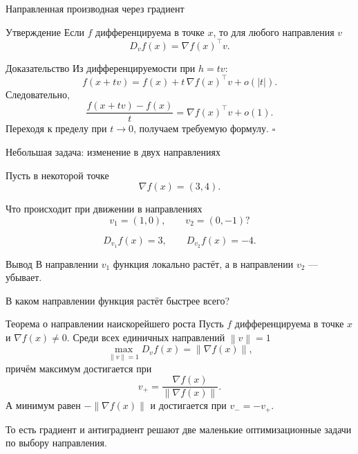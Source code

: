 \documentclass[aspectratio=169,10pt]{beamer}
\newcommand{\norm}[1]{\left\lVert #1\right\rVert}
\newcommand{\grad}{\nabla}
\begin{document}
\begin{frame}{Направленная производная через градиент}
\small
\vspace{0.10em}

\begin{block}{Утверждение}
Если $f$ дифференцируема в точке $x$, то для любого направления $v$
\[
  \boxed{D_vf(x)=\grad f(x)^\top v.}
\]
\end{block}

\begin{block}{Доказательство}
Из дифференцируемости при $h=tv$:
\[
  f(x+tv)=f(x)+t\,\grad f(x)^\top v+o(|t|).
\]
Следовательно,
\[
  \frac{f(x+tv)-f(x)}{t}
  =\grad f(x)^\top v+o(1).
\]
Переходя к пределу при $t\to0$, получаем требуемую формулу. $\square$
\end{block}
\end{frame}

\begin{frame}{Небольшая задача: изменение в двух направлениях}
\vspace{0.55em}

Пусть в некоторой точке
\[
  \grad f(x)=(3,4).
\]

Что происходит при движении в направлениях
\[
  v_1=(1,0),
  \qquad
  v_2=(0,-1)?
\]

\vspace{0.3em}

\[
  D_{v_1}f(x)=3,
  \qquad
  D_{v_2}f(x)=-4.
\]

\begin{block}{Вывод}
В направлении $v_1$ функция локально растёт, а в направлении $v_2$ --- убывает.
\end{block}

\end{frame}

\begin{frame}{В каком направлении функция растёт быстрее всего?}
\small
\vspace{0.15em}

\begin{block}{Теорема о направлении наискорейшего роста}
Пусть $f$ дифференцируема в точке $x$ и $\grad f(x)\neq0$. Среди всех единичных направлений $\norm{v}=1$
\[
  \max_{\norm{v}=1}D_vf(x)=\norm{\grad f(x)},
\]
причём максимум достигается при
\[
  v_+=\frac{\grad f(x)}{\norm{\grad f(x)}}.
\]
А минимум равен $-\norm{\grad f(x)}$ и достигается при $v_-=-v_+$.
\end{block}

\small
То есть градиент и антиградиент решают две маленькие оптимизационные задачи по выбору направления.
\end{frame}
\end{document}
